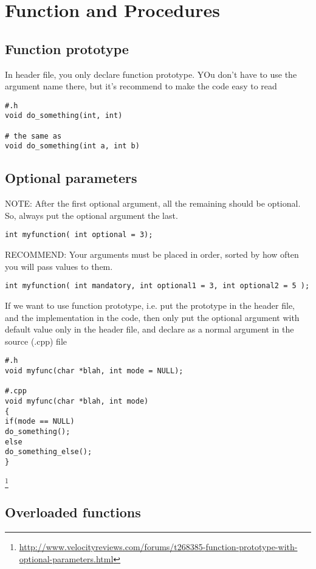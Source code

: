 \chapter{Function and Procedures}

\section{Function prototype}

In header file, you only declare function prototype. YOu don't have to use the
argument name there, but it's recommend to make the code easy to read
\begin{verbatim}
#.h
void do_something(int, int)

# the same as
void do_something(int a, int b)
\end{verbatim}

\section{Optional parameters}

NOTE: After the first optional argument, all the remaining should be optional.
So, always put the optional argument the last.
\begin{verbatim}
int myfunction( int optional = 3);
\end{verbatim}

RECOMMEND: Your arguments must be placed in order, sorted by how often you will
pass values to them.
\begin{verbatim}
int myfunction( int mandatory, int optional1 = 3, int optional2 = 5 );
\end{verbatim}

If we want to use function prototype, i.e. put the prototype in the header file,
and the implementation in the code, then only put the optional argument with
default value only in the header file, and declare as a normal argument in the
source (.cpp) file
\begin{verbatim}
#.h
void myfunc(char *blah, int mode = NULL);

#.cpp
void myfunc(char *blah, int mode)
{
if(mode == NULL)
do_something();
else
do_something_else();
}
\end{verbatim}
\footnote{\url{http://www.velocityreviews.com/forums/t268385-function-prototype-with-optional-parameters.html}}

\section{Overloaded functions}
\label{sec:overloaded-function}
 

